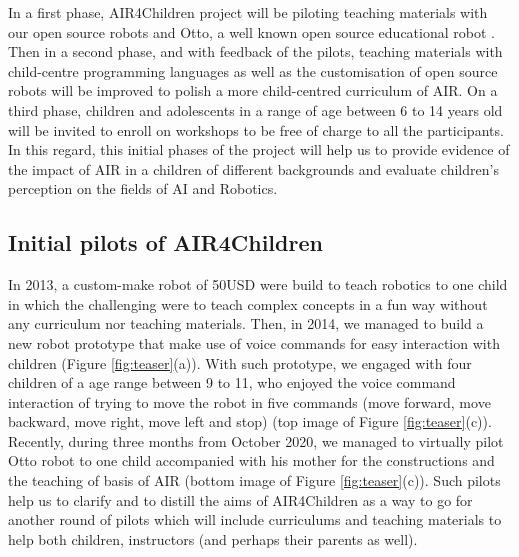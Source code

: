 \documentclass[sigconf]{acmart}
\begin{document}
In a first phase, AIR4Children project will be piloting teaching materials with our open source robots and Otto, a well known open source educational robot \cite{OttoDIY:2016}.  
Then in a second phase, and with feedback of the pilots, teaching materials with child-centre programming languages as well as the customisation of open source robots will be improved to polish a more child-centred curriculum of AIR. 
On a third phase, children and adolescents in a range of age between 6 to 14 years old will be invited to enroll on workshops to be free of charge to all the participants. 
In this regard, this initial phases of the project will help us to provide evidence of the impact of AIR in a children of different backgrounds and evaluate children's perception on the fields of AI and Robotics.  

\subsection{Initial pilots of AIR4Children}
In 2013, a custom-make robot of 50USD were build to teach robotics to one child in which the challenging were to teach complex concepts in a fun way without any curriculum nor teaching materials. 
Then, in 2014, we managed to build a new robot prototype that make use of voice commands for easy interaction with children (Figure \ref{fig:teaser}(a)). 
With such prototype, we engaged with four children of a age range between 9 to 11, who enjoyed the voice command interaction of trying to move the robot in five commands (move forward, move backward, move right, move left and stop) (top image of Figure \ref{fig:teaser}(c)).
Recently, during three months from October 2020, we managed to virtually pilot Otto robot to one child accompanied with his mother for the constructions and the teaching of basis of AIR (bottom image of Figure \ref{fig:teaser}(c)).
Such pilots help us to clarify and to distill the aims of AIR4Children as a way to go for another round of pilots which will include curriculums and teaching materials to help both children, instructors (and perhaps their parents as well).


\end{document}
